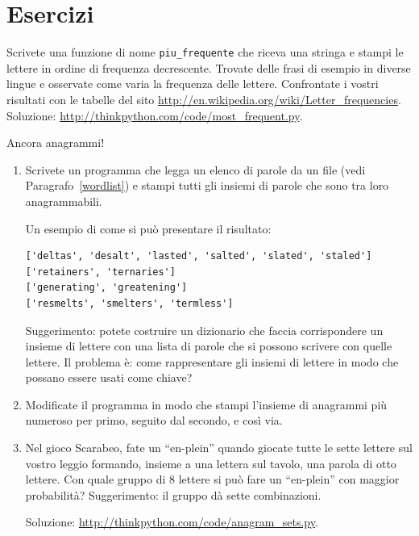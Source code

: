 \documentclass[10pt]{book}
\begin{document}
\section{Esercizi}

\begin{exercise}

Scrivete una funzione di nome \verb"piu_frequente" che riceva una stringa e stampi le lettere in ordine di frequenza decrescente. Trovate delle frasi di esempio in diverse lingue e osservate come varia la frequenza delle lettere. Confrontate i vostri risultati con le tabelle del sito
\url{http://en.wikipedia.org/wiki/Letter_frequencies}.  Soluzione:
\url{http://thinkpython.com/code/most_frequent.py}.   

\end{exercise}


\begin{exercise}
\label{anagrams}

Ancora anagrammi!

\begin{enumerate}

\item Scrivete un programma che legga un elenco di parole da un file (vedi Paragrafo~\ref{wordlist}) e stampi tutti gli insiemi di parole che sono tra loro anagrammabili.

Un esempio di come si può presentare il risultato:

\begin{verbatim}
['deltas', 'desalt', 'lasted', 'salted', 'slated', 'staled']
['retainers', 'ternaries']
['generating', 'greatening']
['resmelts', 'smelters', 'termless']
\end{verbatim}
%
Suggerimento: potete costruire un dizionario che faccia corrispondere un insieme di lettere con una lista di parole che si possono scrivere con quelle lettere. Il problema è: come rappresentare gli insiemi di lettere in modo che possano essere usati come chiave?

\item Modificate il programma in modo che stampi l'insieme di anagrammi più numeroso per primo, seguito dal secondo, e così via.

\item Nel gioco Scarabeo, fate un ``en-plein'' quando giocate tutte le sette lettere sul vostro leggio formando, insieme a una lettera sul tavolo, una parola di otto lettere. Con quale gruppo di 8 lettere si può fare un ``en-plein'' con maggior probabilità?
Suggerimento: il gruppo dà sette combinazioni.


Soluzione: \url{http://thinkpython.com/code/anagram_sets.py}.

\end{enumerate}
\end{exercise}
\end{document}
